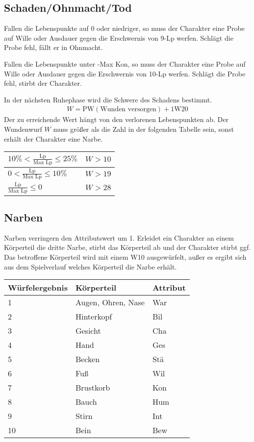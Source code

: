\documentclass[../../Heldenanleitung2]{subfiles}
\begin{document}
\subsection{Schaden/Ohnmacht/Tod}
Fallen die Lebenspunkte auf 0 oder niedriger, so muss der Charakter eine Probe auf Wille oder Ausdauer gegen die Erschwernis von 9-Lp werfen. Schlägt die Probe fehl, fällt er in Ohnmacht.

Fallen die Lebenspunkte unter -Max Kon, so muss der Charakter eine Probe auf Wille oder Ausdauer gegen die Erschwernis von 10-Lp werfen. Schlägt die Probe fehl, stirbt der Charakter.

In der nächsten Ruhephase wird die Schwere des Schadens bestimmt.
\begin{align*}
 W = \text{PW}\left(\text{Wunden versorgen}\right) + 1\text{W}20
\end{align*}
Der zu erreichende Wert hängt von den verlorenen Lebenspunkten ab. Der Wundenwurf $W$ muss größer als die Zahl in der folgenden Tabelle sein, sonst erhält der Charakter eine Narbe.
\begin{center}
\begin{tabular}{|l|l|}
\hline
$10 \% < \frac{\text{Lp}}{\text{Max Lp}} \le 25 \%$ & $W > 10$ \\ \hline
$0 < \frac{\text{Lp}}{\text{Max Lp}} \le 10 \%$ & $W > 19$\\ \hline
$\frac{\text{Lp}}{\text{Max Lp}} \le 0$ & $W > 28$\\ \hline
\end{tabular}
\end{center}

\subsection{Narben}
Narben verringern den Attributswert um 1. Erleidet ein Charakter an einem Körperteil die dritte Narbe, stirbt das Körperteil ab und der Charakter stirbt ggf. Das betroffene Körperteil wird mit einem W10 ausgewürfelt, außer es ergibt sich aus dem Spielverlauf welches Körperteil die Narbe erhält.

\begin{center}
\begin{tabular}{|l|l|l|}
\hline
Würfelergebnis & Körperteil & Attribut \\ \hline
1 & Augen, Ohren, Nase & War \\ \hline
2 & Hinterkopf & Bil \\ \hline
3 & Gesicht & Cha \\ \hline
4 & Hand & Ges \\ \hline
5 & Becken & Stä \\ \hline
6 & Fuß & Wil \\ \hline
7 & Brustkorb & Kon \\ \hline
8 & Bauch & Hum \\ \hline
9 & Stirn & Int \\ \hline
10 & Bein & Bew \\ \hline
\end{tabular}
\end{center}
\end{document}
